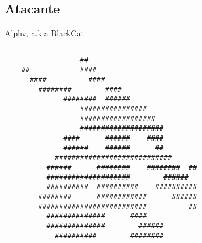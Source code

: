 \documentclass[bookmarks=false,aspectratio=169,9pt]{beamer}
\begin{document}
\subsection{Atacante}
\begin{frame}[fragile]{Alphv, a.k.a BlackCat}
	\begin{columns}
		\begin{column}{0.5\textwidth}
			\begin{verbatim}
                  ##
    ##            ####
      ####          ####
        ########        ####
              ########  ######
                  ################
                  ##################
                  ####################
              ####      ######    ####
              ######    ######      ##
            ############################
          ######      ########    ########  ##
          ####################        ######
          ##########  ##########    ##########
        ########      ############      ######
        ##########################          ##
          ##############      ####
          ##############        ######
            ##########        ########
\end{verbatim}
		\end{column}
	\end{columns}
\end{frame}
\end{document}
